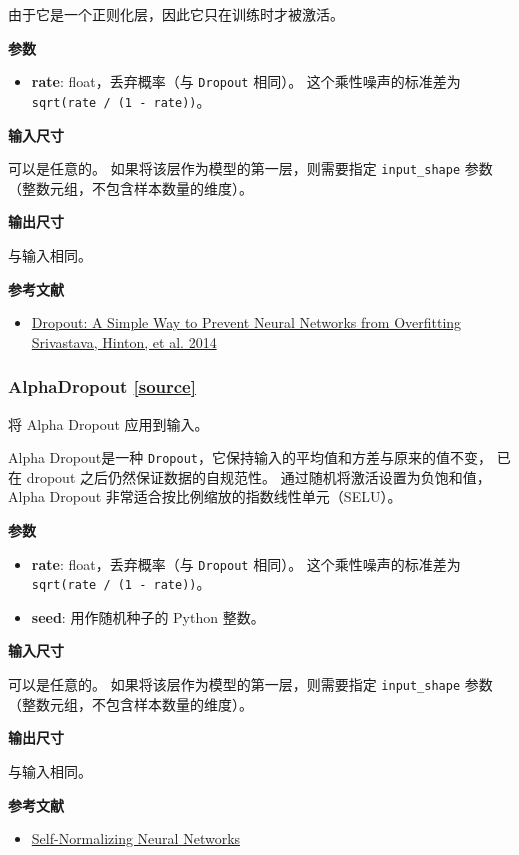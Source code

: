 由于它是一个正则化层，因此它只在训练时才被激活。

\textbf{参数}

\begin{itemize}
\tightlist
\item
  \textbf{rate}: float，丢弃概率（与 \texttt{Dropout} 相同）。
  这个乘性噪声的标准差为 \texttt{sqrt(rate\ /\ (1\ -\ rate))}。
\end{itemize}

\textbf{输入尺寸}

可以是任意的。 如果将该层作为模型的第一层，则需要指定
\texttt{input\_shape} 参数 （整数元组，不包含样本数量的维度）。

\textbf{输出尺寸}

与输入相同。

\textbf{参考文献}

\begin{itemize}
\tightlist
\item
  \href{http://www.cs.toronto.edu/~rsalakhu/papers/srivastava14a.pdf}{Dropout:
  A Simple Way to Prevent Neural Networks from Overfitting Srivastava,
  Hinton, et al. 2014}
\end{itemize}




\subsubsection{AlphaDropout {\href{https://github.com/keras-team/keras/blob/master/keras/layers/noise.py\#L105}{{[}source{]}}}}

\begin{Shaded}
\begin{Highlighting}[]
\OperatorTok{=}\OperatorTok{=}\NormalTok{)}
\end{Highlighting}
\end{Shaded}

将 Alpha Dropout 应用到输入。

Alpha Dropout是一种
\texttt{Dropout}，它保持输入的平均值和方差与原来的值不变， 已在 dropout
之后仍然保证数据的自规范性。 通过随机将激活设置为负饱和值，Alpha Dropout
非常适合按比例缩放的指数线性单元（SELU）。

\textbf{参数}

\begin{itemize}
\tightlist
\item
  \textbf{rate}: float，丢弃概率（与 \texttt{Dropout} 相同）。
  这个乘性噪声的标准差为 \texttt{sqrt(rate\ /\ (1\ -\ rate))}。
\item
  \textbf{seed}: 用作随机种子的 Python 整数。
\end{itemize}

\textbf{输入尺寸}

可以是任意的。 如果将该层作为模型的第一层，则需要指定
\texttt{input\_shape} 参数 （整数元组，不包含样本数量的维度）。

\textbf{输出尺寸}

与输入相同。

\textbf{参考文献}

\begin{itemize}
\tightlist
\item
  \href{https://arxiv.org/abs/1706.02515}{Self-Normalizing Neural
  Networks}
\end{itemize}
\newpage
